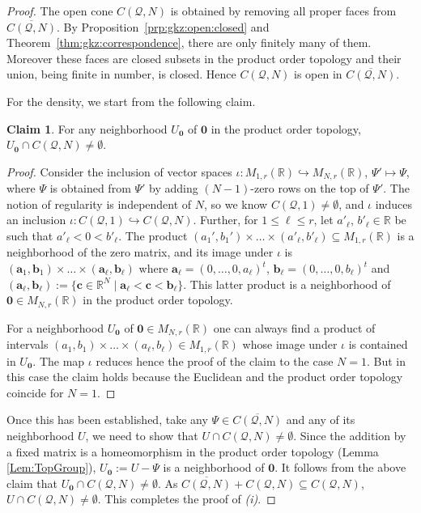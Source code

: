 \documentclass[12pt, a4article]{amsart}   	%
\numberwithin{equation}{section}
\theoremstyle{plain}
\theoremstyle{definition}
\newtheorem*{claim}{Claim}
\newcommand{\mcQ}{{\mathcal Q}}
\begin{document}
\begin{proof}
The open cone $C(\mcQ,N)$ is obtained by removing all proper faces from $\overline{C(\mcQ,N)}$. By Proposition~\ref{prp:gkz:open:closed}  and Theorem~\ref{thm:gkz:correspondence}, there are only  finitely many of them. Moreover these faces are closed subsets in the product order topology and their union, being finite in number, is closed. Hence $C(\mcQ,N)$ is open in $\overline{C(\mcQ,N)}$. 

For the density, we start from the following claim.

\begin{claim}
For any neighborhood $U_{\mathbf{0}}$ of $\mathbf{0}$ in the product order topology, $U_{\mathbf{0}}\cap C(\mcQ,N)\neq\emptyset$.
\end{claim}

\begin{proof}
Consider the inclusion of vector spaces $\iota:M_{1,r}(\mathbb R)\hookrightarrow M_{N,r}(\mathbb R)$, $\Psi'\mapsto\Psi$, where $\Psi$ is obtained from $\Psi'$ by adding $(N-1)$-zero rows on the top of $\Psi'$. The notion of regularity is independent of $N$, so we know $C(\mcQ,1)\neq\emptyset$, and $\iota$ induces an inclusion $\iota: C(\mcQ,1)\hookrightarrow C(\mcQ,N)$. Further, for $1\leq \ell\leq r$, let $a'_\ell$, $b'_\ell\in\mathbb{R}$ be such that $a'_\ell<0<b'_\ell$. The product $(a_1',b_1')\times\ldots\times(a'_\ell,  b'_\ell)\subseteq M_{1,r}(\mathbb R)$ is a neighborhood of the zero matrix, and its image under $\iota$ is $(\mathbf a_1,\mathbf b_1)\times \ldots\times (\mathbf a_\ell,\mathbf b_\ell)$ where $\mathbf{a}_\ell=(0,\ldots,0,a_\ell)^t$, $\mathbf b_\ell=(0,\ldots,0,b_\ell)^t$ and $(\mathbf{a}_\ell,\mathbf{b}_\ell):=\{\mathbf{c}\in\mathbb{R}^N\mid \mathbf{a}_\ell<\mathbf{c}<\mathbf{b}_\ell\}$. This latter product is a neighborhood of $\mathbf{0}\in M_{N,r}(\mathbb R)$ in the product order topology. 

For a neighborhood $U_{\mathbf 0}$ of $\mathbf{0}\in M_{N, r}(\mathbb R)$ one can always find a product of intervals $(a_1,b_1)\times\ldots\times (a_\ell,b_\ell)\in M_{1, r}(\mathbb R)$ whose image under $\iota$ is contained in $U_{\mathbf 0}$. The map $\iota$ reduces hence the proof of the claim to the case $N=1$. But in this case the claim holds because the Euclidean and the product order topology coincide for $N=1$.
\end{proof}

Once this has been established, take any $\Psi\in \overline{C(\mcQ,N)}$ and any of its neighborhood $U$, we need to show that $U\cap C(\mcQ,N)\neq\emptyset$. Since the addition by a fixed matrix is a homeomorphism in the product order topology (Lemma \ref{Lem:TopGroup}), $U_{\mathbf{0}}:=U-\Psi$ is a neighborhood of $\mathbf{0}$. It follows from the above claim that $U_{\mathbf{0}}\cap C(\mcQ,N)\neq\emptyset$. As $\overline{C(\mcQ,N)}+C(\mcQ,N)\subseteq C(\mcQ,N)$, $U\cap C(\mcQ,N)\neq\emptyset$. This completes the proof of \emph{(i)}.


\end{proof}
\end{document}
